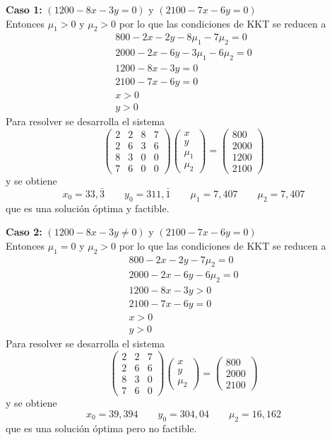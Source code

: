 \begin{solucion}
\textbf{Caso 1:} $(1200-8x-3y=0)$ y $(2100-7x-6y=0)$
\\Entonces $\mu_1 > 0$ y $\mu_2 > 0$ por lo que las condiciones de KKT se reducen a
\begin{align*}
800-2x-2y-8\mu_1 -  7\mu_2 = 0 \\
2000-2x-6y-3\mu_1 - 6\mu_2 = 0 \\
1200-8x-3y				   = 0 \\
2100-7x-6y				   = 0 \\
x						   > 0 \\
y						   > 0
\end{align*}
Para resolver se desarrolla el sistema
\[
\begin{pmatrix}
2 & 2 & 8 & 7 \\
2 & 6 & 3 & 6 \\
8 & 3 & 0 & 0 \\
7 & 6 & 0 & 0 
\end{pmatrix} 
\begin{pmatrix}
x \\ y \\ \mu_1 \\ \mu_2
\end{pmatrix}
=
\begin{pmatrix}
800  \\ 2000 \\ 1200 \\ 2100
\end{pmatrix}
\]
y se obtiene
$$x_0 = 33,\bar{3} \qquad y_0 = 311,\bar{1} \qquad \mu_1 = 7,407 \qquad \mu_2 = 7,407$$
que es una soluci\'on \'optima y factible.

\textbf{Caso 2:} $(1200-8x-3y\neq 0)$ y $(2100-7x-6y=0)$
\\Entonces $\mu_1 = 0$ y $\mu_2 > 0$ por lo que las condiciones de KKT se reducen a
\begin{align*}
800-2x-2y-7\mu_2		   = 0 \\
2000-2x-6y-6\mu_2		   = 0 \\
1200-8x-3y				   > 0 \\
2100-7x-6y				   = 0 \\
x						   > 0 \\
y						   > 0
\end{align*}
Para resolver se desarrolla el sistema
\[
\begin{pmatrix}
2 & 2 & 7 \\
2 & 6 & 6 \\
8 & 3 & 0 \\
7 & 6 & 0  
\end{pmatrix} 
\begin{pmatrix}
x \\ y \\ \mu_2
\end{pmatrix}
=
\begin{pmatrix}
800  \\ 2000 \\ 2100
\end{pmatrix}
\]
y se obtiene
$$x_0 = 39,394 \qquad y_0 = 304,04 \qquad \mu_2 = 16,162$$
que es una soluci\'on \'optima pero no factible.


\end{solucion}
